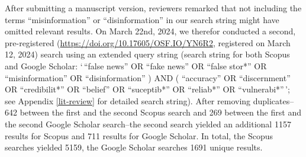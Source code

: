 \documentclass[
  doc,floatsintext]{apa6}
\begin{document}
After submitting a manuscript version, reviewers remarked that not including the terms ``misinformation'' or ``disinformation'' in our search string might have omitted relevant results. On March 22nd, 2024, we therefor conducted a second, pre-registered (\url{https://doi.org/10.17605/OSF.IO/YN6R2}, registered on March 12, 2024) search using an extended query string (search string for both Scopus and Google Scholar: `\,``false news'' OR ``fake news'' OR ``false stor*'' OR ``misinformation'' OR ``disinformation'' ) AND ( ``accuracy'' OR ``discernment'' OR ``credibilit*'' OR ``belief'' OR ``suceptib*'' OR ``reliab*'' OR ``vulnerabi*''\,'; see Appendix \ref{lit-review} for detailed search string). After removing duplicates--642 between the first and the second Scopus search and 269 between the first and the second Google Scholar search--the second search yielded an additional 1157 results for Scopus and 711 results for Google Scholar. In total, the Scopus searches yielded 5159, the Google Scholar searches 1691 unique results.
\end{document}

